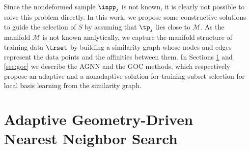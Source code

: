 \documentclass[journal]{IEEEtran}
\begin{document}



Since the nondeformed sample $\inpp_j$ is not known, it is clearly not possible to solve this problem directly. In this work, we propose some constructive solutions to guide the selection of  $S $ by assuming that $\tp_j$ lies close to $\mathcal{M}$. As the manifold $\mathcal{M}$ is not known analytically, we capture the manifold structure of training data $\trset$ by building a similarity graph whose nodes and edges represent the data points and the affinities between them. In Sections \ref{sec:agnn} and \ref{sec:goc} we describe the AGNN and the GOC methods, which respectively propose an adaptive and a nonadaptive solution for training subset selection for local basis learning from the similarity graph.





%
%
%
%
\section{Adaptive Geometry-Driven Nearest Neighbor Search}
\label{sec:agnn}
\end{document}
